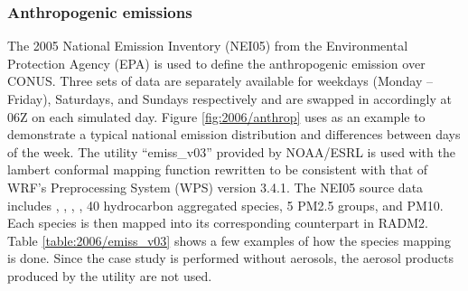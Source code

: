 	
	\subsubsection{Anthropogenic emissions}\label{sssec:2006/method/emiss/anthrop}

	The 2005 National Emission Inventory (NEI05) from the Environmental Protection Agency (EPA) is used to define the anthropogenic emission over CONUS. Three sets of data are separately available for weekdays (Monday -- Friday), Saturdays, and Sundays respectively and are swapped in accordingly at 06Z on each simulated day. Figure \ref{fig:2006/anthrop} uses  as an example to demonstrate a typical national emission distribution and differences between days of the week. The utility ``emiss\_v03'' provided by NOAA/ESRL is used with the lambert conformal mapping function rewritten to be consistent with that of WRF's Preprocessing System (WPS) version 3.4.1. The NEI05 source data includes , , , , 40 hydrocarbon aggregated species, 5 PM2.5 groups, and PM10. Each species is then mapped into its corresponding counterpart in RADM2. Table \ref{table:2006/emiss_v03} shows a few examples of how the species mapping is done. Since the case study is performed without aerosols, the aerosol products produced by the utility are not used.
	
